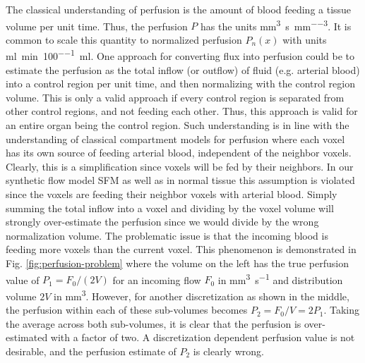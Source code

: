 \documentclass[paper=a4, fontsize=11pt,parskip=half,headings=small]{scrartcl}
\newcommand{\siqt}{\cubic\milli\meter\per\second}
\newcommand{\siP}{\cubic\milli\meter\per\second\per\cubic\milli\meter}
\newcommand{\siPn}{\milli\litre\per\minute\per100\milli\litre}
\begin{document}
	The classical understanding of perfusion is the amount of blood feeding a tissue volume per unit time. 
	Thus, the perfusion $P$ has the units \si{\siP}.
	It is common to scale this quantity to normalized perfusion $P_n(x)$ with units \si{\siPn}. 
	One approach for converting flux into perfusion could be to estimate the perfusion as the total inflow (or outflow) of fluid (e.g. arterial blood) into a control region per unit time, and then normalizing with the control region volume. 
	This is only a valid approach if every control region is separated from other control regions, and not feeding each other. 
	Thus, this approach is valid for an entire organ being the control region. 
	Such understanding is in line with the understanding of classical compartment models for perfusion where each voxel has its own source of feeding arterial blood, independent of the neighbor voxels. 
	Clearly, this is a simplification since voxels will be fed by their neighbors. 
	In our synthetic flow model SFM as well as in normal tissue this assumption is violated since the voxels are feeding their neighbor voxels with arterial blood. 
	Simply summing the total inflow into a voxel and dividing by the voxel volume will strongly over-estimate the perfusion since we would divide by the wrong normalization volume. 
	The problematic issue is that the incoming blood is feeding more voxels than the current voxel. 
	This phenomenon is demonstrated in Fig. \ref{fig:perfusion-problem} where the volume on the left has the true perfusion value of $P_1 = F_0/(2V)$ for an incoming flow $F_0$ in \si{\siqt} and distribution volume $2V$ in \si{\cubic\milli\meter}. 
	However, for another discretization as shown in the middle, the perfusion within each of these sub-volumes becomes $P_2 = F_0/V = 2P_1$. 
	Taking the average across both sub-volumes, it is clear that the perfusion is over-estimated with a factor of two. 
	A discretization dependent perfusion value is not desirable, and the perfusion estimate of $P_2$ is clearly wrong. 
\end{document}

